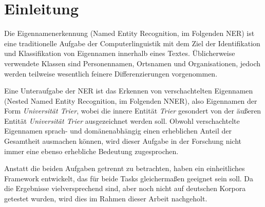 

\chapter{Einleitung}
\label{ch:Einleitung}

Die Eigennamenerkennung (Named Entity Recognition, im Folgenden NER) ist eine traditionelle Aufgabe der Computerlinguistik mit dem Ziel der Identifikation und Klassifikation von Eigennamen innerhalb eines Textes. Üblicherweise verwendete Klassen sind Personennamen, Ortsnamen und Organisationen, jedoch werden teilweise wesentlich feinere Differenzierungen vorgenommen.

Eine Unteraufgabe der NER ist das Erkennen von verschachtelten Eigennamen (Nested Named Entity Recognition, im Folgenden NNER), also Eigennamen der Form \emph{Universität Trier}, wobei die innere Entität \emph{Trier} gesondert von der äußeren Entität \emph{Universität Trier} ausgezeichnet werden soll. Obwohl verschachtelte Eigennamen sprach- und domänenabhängig einen erheblichen Anteil der Gesamtheit ausmachen können, wird dieser Aufgabe in der Forschung nicht immer eine ebenso erhebliche Bedeutung zugesprochen.

Anstatt die beiden Aufgaben getrennt zu betrachten, haben \cite{li2019unified} ein einheitliches Framework entwickelt, das für beide Tasks gleichermaßen geeignet sein soll. Da die Ergebnisse vielversprechend sind, aber noch nicht auf deutschen Korpora getestet wurden, wird dies im Rahmen dieser Arbeit nachgeholt.





